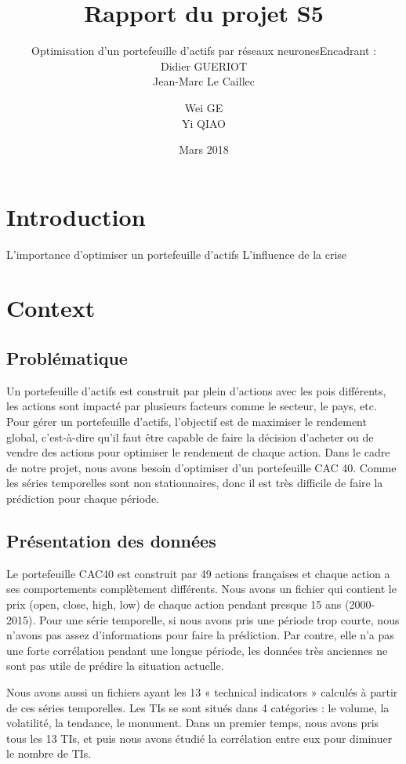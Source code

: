 \documentclass{article}
\author{Wei GE \\ Yi QIAO}
\date{Mars 2018}
\title{Rapport du projet S5}
\subtitle{Optimisation d'un portefeuille d'actifs par réseaux neurones}
\subtitle{Encadrant : \\ Didier GUERIOT \\ Jean-Marc Le Caillec}
\begin{document}
	
\imtaMaketitlepage

\tableofcontents

\newpage

\section{Introduction}
L'importance d'optimiser un portefeuille d'actifs
L'influence de la crise

\section{Context}


\subsection{Problématique}
Un portefeuille d'actifs est construit par plein d'actions avec les pois différents, les actions sont impacté par plusieurs facteurs comme le secteur, le pays, etc. Pour gérer un portefeuille d'actifs, l'objectif est de maximiser le rendement global, c'est-à-dire qu'il faut être capable de faire la décision d'acheter ou de vendre des actions pour optimiser le rendement de chaque action. Dans le cadre de notre projet, nous avons besoin d’optimiser d'un portefeuille CAC 40. Comme les séries temporelles sont non stationnaires, donc il est très difficile de faire la prédiction pour chaque période.

\subsection{Présentation des données}
Le portefeuille CAC40 est construit par 49 actions françaises et chaque action a ses comportements complètement différents. Nous avons un fichier qui contient le prix (open, close, high, low) de chaque action pendant presque 15 ans (2000-2015). Pour une série temporelle, si nous avons pris une période trop courte, nous n'avons pas assez d'informations pour faire la prédiction. Par contre, elle n'a pas une forte corrélation pendant une longue période, les données très anciennes ne sont pas utile de prédire la situation actuelle.

Nous avons aussi un fichiers ayant les 13 « technical indicators » calculés à partir de ces séries temporelles. Les TIs se sont situés dans 4 catégories : le volume, la volatilité, la tendance, le monument. Dans un premier temps, nous avons pris tous les 13 TIs, et puis nous avons étudié la corrélation entre eux pour diminuer le nombre de TIs. 
\end{document}
